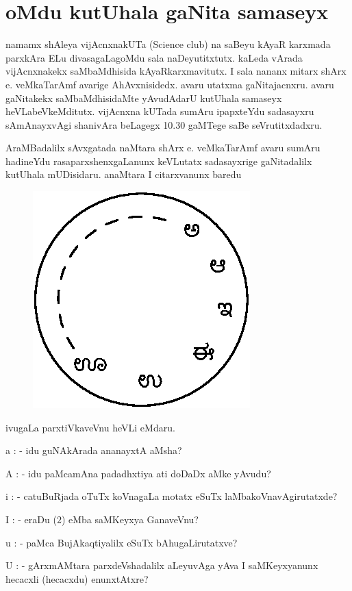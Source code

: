 \chapter{oMdu kutUhala gaNita samaseyx}

namamx shAleya vijAcnxnakUTa ({\rm Science club}) na saBeyu kAyaR karxmada parxkAra ELu divasagaLagoMdu sala naDeyutitxtutx. kaLeda vArada vijAcnxnakekx saMbaMdhisida kAyaRkarxmavitutx. I sala nananx mitarx shArx e. veMkaTarAmf avarige AhAvxnisidedx. avaru utatxma gaNitajacnxru. avaru gaNitakekx saMbaMdhisidaMte yAvudAdarU kutUhala samaseyx heVLabeVkeMditutx. vijAcnxna kUTada sumAru ipapxteYdu sadasayxru sAmAnayxvAgi shanivAra beLagegx {\rm 10.30} gaMTege saBe seVrutitxdadxru.

AraMBadalilx sAvxgatada naMtara shArx e. veMkaTarAmf avaru sumAru hadineYdu rasaparxshenxgaLanunx keVLutatx sadasayxrige gaNitadalilx kutUhala mUDisidaru. anaMtara I citarxvanunx baredu
\begin{figure}[H]
\centering
\includegraphics{src/figures/fig6.eps}
\end{figure}

ivugaLa parxtiVkaveVnu heVLi eMdaru.

a : - idu guNAkArada ananayxtA aMsha?

A : - idu paMcamAna padadhxtiya ati doDaDx aMke yAvudu?

i : - catuBuRjada oTuTx koVnagaLa motatx eSuTx laMbakoVnavAgirutatxde?

I : - eraDu ($2$) eMba saMKeyxya GanaveVnu?

u : - paMca BujAkaqtiyalilx eSuTx bAhugaLirutatxve?

U : - gArxmAMtara parxdeVshadalilx aLeyuvAga yAva I saMKeyxyanunx hecacxli (hecacxdu) enunxtAtxre?

